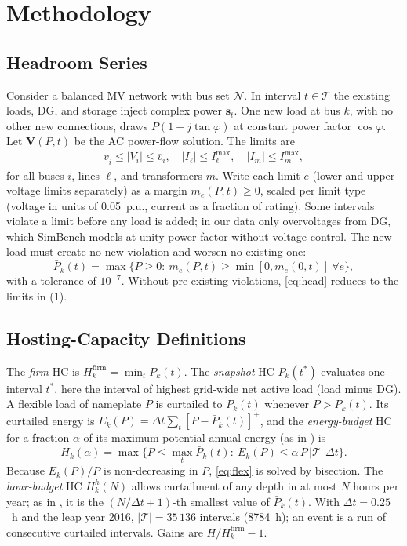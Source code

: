 \documentclass[conference,letterpaper]{IEEEtran}
\begin{document}
\section{Methodology}
\subsection{Headroom Series}
Consider a balanced MV network with bus set $\mathcal N$. In interval $t\in\mathcal T$ the existing loads, DG, and storage inject complex power $\mathbf s_t$. One new load at bus $k$, with no other new connections, draws $P(1+j\tan\varphi)$ at constant power factor $\cos\varphi$. Let $\mathbf V(P,t)$ be the AC power-flow solution. The limits are
\begin{align}
\underline v_i \le |V_i| \le \overline v_i,\quad |I_\ell|\le I_\ell^{\max},\quad |I_m|\le I_m^{\max},
\end{align}
for all buses $i$, lines $\ell$, and transformers $m$. Write each limit $e$ (lower and upper voltage limits separately) as a margin $m_e(P,t)\ge 0$, scaled per limit type (voltage in units of 0.05~p.u., current as a fraction of rating). Some intervals violate a limit before any load is added; in our data only overvoltages from DG, which SimBench models at unity power factor without voltage control. The new load must create no new violation and worsen no existing one:
\begin{equation}
\bar P_k(t)=\max\{P\ge 0:\ m_e(P,t)\ge\min[0,m_e(0,t)]\ \forall e\},\label{eq:head}
\end{equation}
with a tolerance of $10^{-7}$. Without pre-existing violations, \eqref{eq:head} reduces to the limits in (1).

\subsection{Hosting-Capacity Definitions}
The \emph{firm} HC is $H_k^{\mathrm{firm}}=\min_{t}\bar P_k(t)$. The \emph{snapshot} HC $\bar P_k(t^\ast)$ evaluates one interval $t^\ast$, here the interval of highest grid-wide net active load (load minus DG). A flexible load of nameplate $P$ is curtailed to $\bar P_k(t)$ whenever $P>\bar P_k(t)$. Its curtailed energy is $E_k(P)=\Delta t\sum_t[P-\bar P_k(t)]^+$, and the \emph{energy-budget} HC for a fraction $\alpha$ of its maximum potential annual energy (as in \cite{duke}) is
\begin{equation}
H_k(\alpha)=\max\{P\le \max_t\bar P_k(t):\ E_k(P)\le \alpha\,P\,|\mathcal T|\,\Delta t\}.\label{eq:flex}
\end{equation}
Because $E_k(P)/P$ is non-decreasing in $P$, \eqref{eq:flex} is solved by bisection. The \emph{hour-budget} HC $H_k^{h}(N)$ allows curtailment of any depth in at most $N$ hours per year; as in \cite{gu2026hicss}, it is the $(N/\Delta t+1)$-th smallest value of $\bar P_k(t)$. With $\Delta t=0.25$~h and the leap year 2016, $|\mathcal T|=35\,136$ intervals (8784~h); an event is a run of consecutive curtailed intervals. Gains are $H/H_k^{\mathrm{firm}}-1$.
\end{document}
